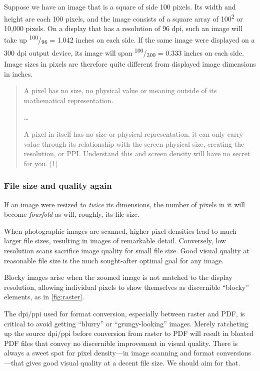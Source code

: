 \documentclass[
  11pt,
  british,
  a4paper,
]{article}
\begin{document}
Suppose we have an image that is a square of side 100 pixels. Its width
and height are each 100 pixels, and the image consists of a square array
of 100\textsuperscript{2} or 10,000 pixels. On a display that has a
resolution of 96 dpi, such an image will take up
\textsuperscript{100}/\textsubscript{96} = 1.042 inches on each side. If
the same image were displayed on a 300 dpi output device, its image will
span \textsuperscript{100}/\textsubscript{300} = 0.333 inches on each
side. Image sizes in pixels are therefore quite different from displayed
image dimensions in inches.

\begin{quote}
A pixel has no size, no physical value or meaning outside of its
mathematical representation.

\ldots{}

A pixel in itself has no size or physical representation, it can only
carry value through its relationship with the screen physical size,
creating the resolution, or PPI. Understand this and screen density will
have no secret for you. {[}1{]}
\end{quote}

\hypertarget{file-size-and-quality-again}{%
\subsubsection{File size and quality
again}\label{file-size-and-quality-again}}

If an image were resized to \emph{twice} its dimensions, the number of
pixels in it will become \emph{fourfold} as will, roughly, its file
size.

When photographic images are scanned, higher pixel densities lead to
much larger file sizes, resulting in images of remarkable detail.
Conversely, low resolution scans sacrifice image quality for small file
size. Good visual quality at reasonable file size is the much
sought-after optimal goal for any image.

Blocky images arise when the zoomed image is not matched to the display
resolution, allowing individual pixels to show themselves as discernible
``blocky'' elements, as in \cref{fig:raster}.

The dpi/ppi used for format conversion, especially between raster and
PDF, is critical to avoid getting ``blurry'' or ``grungy-looking''
images. Merely ratcheting up the source dpi/ppi before conversion from
raster to PDF will result in bloated PDF files that convey no
discernible improvement in visual quality. There is always a sweet spot
for pixel density---in image scanning and format conversions---that
gives good visual quality at a decent file size. We should aim for that.
\end{document}
